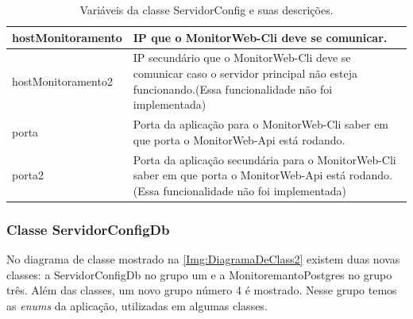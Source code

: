 \begin{table}[H]
\begin{tabular}{|l|l|}
hostMonitoramento                      & \multicolumn{1}{p{10.00cm}|}{IP que o MonitorWeb-Cli deve se comunicar.}\\ \hline
hostMonitoramento2                     & \multicolumn{1}{p{10.00cm}|}{IP secundário que o MonitorWeb-Cli deve se comunicar caso o servidor principal não esteja funcionando.(Essa funcionalidade não foi implementada)} \\ \hline
porta                                  & \multicolumn{1}{p{10.00cm}|}{Porta da aplicação para o MonitorWeb-Cli saber em que porta o MonitorWeb-Api está rodando.} \\ \hline
porta2                                 & \multicolumn{1}{p{10.00cm}|}{Porta da aplicação secundária para o MonitorWeb-Cli saber em que porta o MonitorWeb-Api está rodando.(Essa funcionalidade não foi implementada)} \\ \hline
\end{tabular}
\caption[Variáveis da classe ServidorConfig e suas descrições.]{Variáveis da classe ServidorConfig e suas descrições.}
\label{Tab:VariaveisServidorConfig}
\end{table}


\subsubsection{Classe ServidorConfigDb}\label{subsubsec:ClasseServidorConfigDb}

No diagrama de classe mostrado na \autoref{Img:DiagramaDeClass2} existem duas novas classes: a ServidorConfigDb no grupo um e a MonitoremantoPostgres no grupo três. Além das classes, um novo grupo número 4 é mostrado. Nesse grupo temos as \textit{enums} da aplicação, utilizadas em algumas classes.

